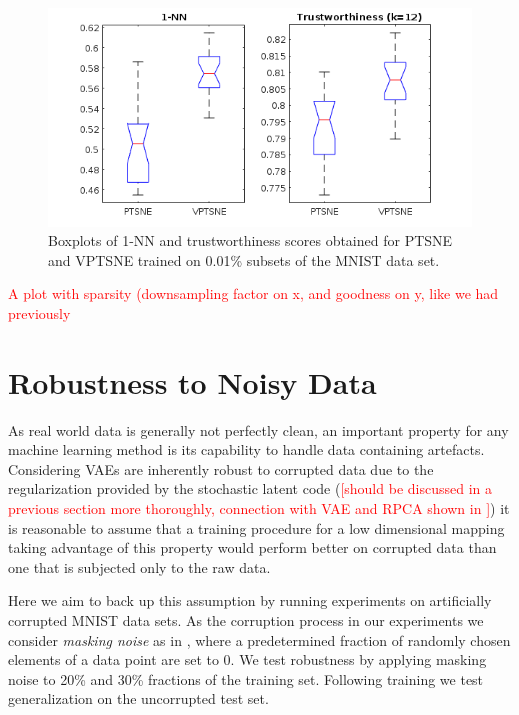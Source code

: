 \begin{figure}[!htb]
  \centering
  \includegraphics[width=\textwidth]{images/subset_combined_boxplot.png}
  \caption{Boxplots of 1-NN and trustworthiness scores obtained for PTSNE and VPTSNE trained on 0.01\% subsets of the MNIST data set.}
  \label{fig:subset_combined_boxplot}
\end{figure}

\textcolor{red}{ A plot with sparsity (downsampling factor on x, and goodness on y, like we had previously }  

\section{Robustness to Noisy Data}
\label{subsection:robustness_to_noisy_data}

As real world data is generally not perfectly clean, an important property for any machine learning method is its capability to handle data containing artefacts. Considering VAEs are inherently robust to corrupted data due to the regularization provided by the stochastic latent code (\textcolor{red}{[should be discussed in a previous section more thoroughly, connection with VAE and RPCA \citep{rpca_1, rpca_2} shown in \citep{hidden_talents_of_the_vae}]}) it is reasonable to assume that a training procedure for a low dimensional mapping taking advantage of this property would perform better on corrupted data than one that is subjected only to the raw data.

Here we aim to back up this assumption by running experiments on artificially corrupted MNIST data sets. As the corruption process in our experiments we consider \textit{masking noise} as in \cite{stacked_denoising_ae}, where a predetermined fraction of randomly chosen elements of a data point are set to 0. We test robustness by applying masking noise to 20\% and 30\% fractions of the training set. Following training we test generalization on the uncorrupted test set.

